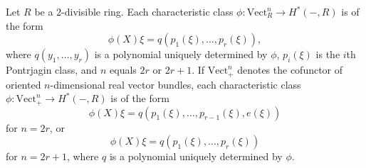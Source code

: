 Let $R$ be a $2$-divisible ring. Each characteristic class $\phi \colon \mathrm{Vect}_R^n \to H^*(-, R)$ is of the form
$$\phi(X)\xi = q(p_1(\xi), \ldots, p_r(\xi)),$$
where $q(y_1, \ldots, y_r)$ is a polynomial uniquely determined by $\phi$, $p_i(\xi)$ is the $i$th Pontrjagin class, and $n$ equals $2r$ or $2r + 1$. If $\mathrm{Vect}_+^n$ denotes the cofunctor of oriented $n$-dimensional real vector bundles, each characteristic class $\phi \colon \mathrm{Vect}_+^n \to H^*(-, R)$ is of the form
$$\phi(X)\xi = q(p_1(\xi), \ldots, p_{r-1}(\xi), e(\xi))$$
for $n = 2r$, or
$$\phi(X)\xi = q(p_1(\xi), \ldots, p_r(\xi))$$
for $n = 2r + 1$, where $q$ is a polynomial uniquely determined by $\phi$.
